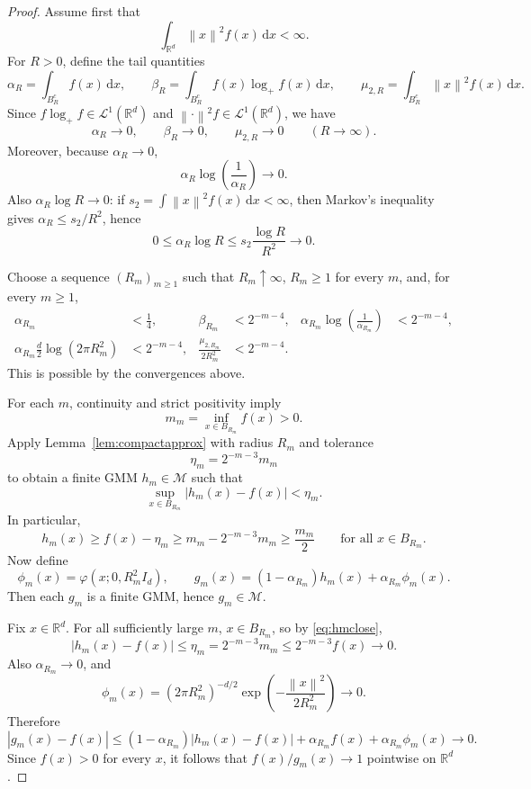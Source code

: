 \documentclass[10pt,a4paper]{amsart}
\begin{document}
\begin{proof}
Assume first that
\[
\int_{\mathbb{R}^d}\left\lVert x \right\rVert^2f(x)\,\mathrm{d}x<\infty.
\]
For $R>0$, define the tail quantities
\[
\alpha_R=\int_{B_{R}^c} f(x)\,\mathrm{d}x,
\qquad
\beta_R=\int_{B_{R}^c} f(x)\log_+ f(x)\,\mathrm{d}x,
\qquad
\mu_{2,R}=\int_{B_{R}^c}\left\lVert x \right\rVert^2 f(x)\,\mathrm{d}x.
\]
Since $f\log_+f\in \mathcal L^1(\mathbb{R}^d)$ and $\left\lVert \cdot \right\rVert^2 f\in \mathcal L^1(\mathbb{R}^d)$, we have
\[
\alpha_R\to0,
\qquad
\beta_R\to0,
\qquad
\mu_{2,R}\to0
\qquad (R\to\infty).
\]
Moreover, because $\alpha_R\to0$,
\[
\alpha_R\log\!\left(\frac1{\alpha_R}\right)\to0.
\]
Also $\alpha_R\log R\to0$: if $s_2=\int \left\lVert x \right\rVert^2f(x)\,\mathrm{d}x<\infty$, then Markov's inequality gives $\alpha_R\le s_2/R^2$, hence
\[
0\le \alpha_R\log R\le s_2\frac{\log R}{R^2}\to0.
\]

Choose a sequence $(R_m)_{m\ge1}$ such that $R_m\uparrow\infty$, $R_m\ge1$ for every $m$, and, for every $m\ge1$,
\begin{equation}
\label{eq:Rmchoice}
\begin{aligned}
\alpha_{R_m}&<\tfrac14,
&\beta_{R_m}&<2^{-m-4},
&\alpha_{R_m}\log\!\left(\frac1{\alpha_{R_m}}\right)&<2^{-m-4},\\
\alpha_{R_m}\frac d2\log(2\pi R_m^2)&<2^{-m-4},
&\frac{\mu_{2,R_m}}{2R_m^2}&<2^{-m-4}.
\end{aligned}
\end{equation}
This is possible by the convergences above.

For each $m$, continuity and strict positivity imply
\[
m_m=\inf_{x\in B_{R_m}} f(x)>0.
\]
Apply Lemma~\ref{lem:compactapprox} with radius $R_m$ and tolerance
\[
\eta_m=2^{-m-3}m_m
\]
to obtain a finite GMM $h_m\in\mathcal M$ such that
\begin{equation}
\label{eq:hmclose}
\sup_{x\in B_{R_m}}|h_m(x)-f(x)|<\eta_m.
\end{equation}
In particular,
\begin{equation}
\label{eq:hmlower}
h_m(x)\ge f(x)-\eta_m\ge m_m-2^{-m-3}m_m\ge \frac{m_m}{2}
\qquad \text{for all }x\in B_{R_m}.
\end{equation}
Now define
\[
\phi_m(x)=\varphi(x;0,R_m^2 I_d),
\qquad
g_m(x)=(1-\alpha_{R_m})h_m(x)+\alpha_{R_m}\phi_m(x).
\]
Then each $g_m$ is a finite GMM, hence $g_m\in\mathcal M$.

Fix $x\in\mathbb{R}^d$. For all sufficiently large $m$, $x\in B_{R_m}$, so by \eqref{eq:hmclose},
\[
|h_m(x)-f(x)|\le \eta_m=2^{-m-3}m_m\le 2^{-m-3}f(x)\to0.
\]
Also $\alpha_{R_m}\to0$, and
\[
\phi_m(x)=(2\pi R_m^2)^{-d/2}\exp\!\left(-\frac{\left\lVert x \right\rVert^2}{2R_m^2}\right)\to0.
\]
Therefore
\[
|g_m(x)-f(x)|
\le (1-\alpha_{R_m})|h_m(x)-f(x)| + \alpha_{R_m}f(x)+\alpha_{R_m}\phi_m(x)\to0.
\]
Since $f(x)>0$ for every $x$, it follows that $f(x)/g_m(x)\to1$ pointwise on $\mathbb{R}^d$.


\end{proof}
\end{document}
